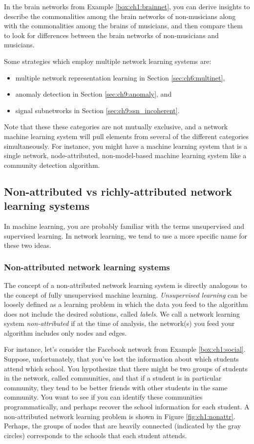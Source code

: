 In the brain networks from Example \ref{box:ch1:brainnet}, you can derive insights to describe the commonalities among the brain networks of non-musicians along with the commonalities among the brains of musicians, and then compare them to look for differences between the brain networks of non-musicians and musicians.


Some strategies which employ multiple network learning systems are:
\begin{itemize}
\item multiple network representation learning in Section \ref{sec:ch6:multinet},
\item anomaly detection in Section \ref{sec:ch9:anomaly}, and
\item signal subnetworks in Section \ref{sec:ch9:ssn_incoherent}.
\end{itemize}

Note that these these categories are not mutually exclusive, and a network machine learning system will pull elements from several of the different categories simultaneously. For instance, you might have a machine learning system that is a single network, node-attributed, non-model-based machine learning system like a community detection algorithm.

\subsection{Non-attributed vs richly-attributed network learning systems}

In machine learning, you are probably familiar with the terms unsupervised and supervised learning. In network learning, we tend to use a more specific name for these two ideas.


\subsubsection{Non-attributed network learning systems}

The concept of a non-attributed network learning system is directly analogous to the concept of fully unsupervised machine learning. \textit{Unsupervised learning} can be loosely defined as a learning problem in which the data you feed to the algorithm does not include the desired solutions, called \textit{labels}. We call a network learning system \textit{non-attributed} if at the time of analysis, the network(s) you feed your algorithm includes only nodes and edges.


For instance, let's consider the Facebook network from Example \ref{box:ch1:social}. Suppose, unfortunately, that you've lost the information about which students attend which school. You hypothesize that there might be two groups of students in the network, called {communities}, and that if a student is in particular community, they tend to be better friends with other students in the same community. You want to see if you can identify these communities programmatically, and perhaps recover the school information for each student. A non-attributed network learning problem is shown in Figure \ref{fig:ch1:nonattr}. Perhaps, the groups of nodes that are heavily connected (indicated by the gray circles) corresponds to the schools that each student attends.


